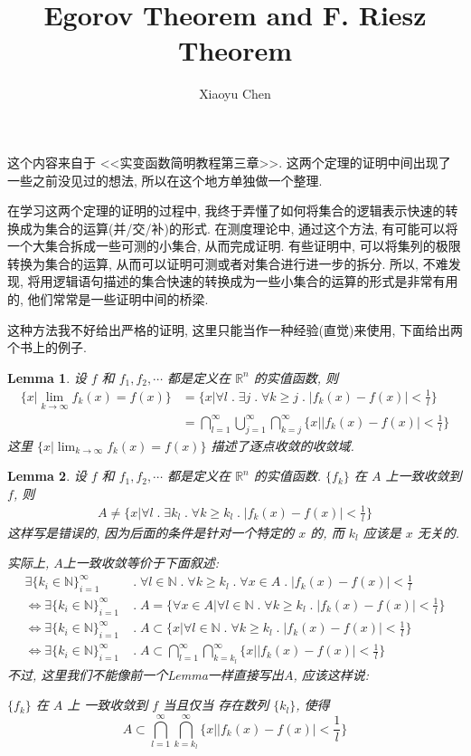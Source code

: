 \documentclass{article}
\title{Egorov Theorem and F. Riesz Theorem}
\author{Xiaoyu Chen}
\date{}
\newtheorem{lemma}{Lemma}
\begin{document}
\maketitle
这个内容来自于 <<实变函数简明教程第三章>>.
这两个定理的证明中间出现了一些之前没见过的想法, 所以在这个地方单独做一个整理.

在学习这两个定理的证明的过程中, 我终于弄懂了如何将集合的逻辑表示快速的转换成为集合的运算(并/交/补)的形式.
在测度理论中, 通过这个方法, 有可能可以将一个大集合拆成一些可测的小集合, 从而完成证明.
有些证明中, 可以将集列的极限转换为集合的运算, 从而可以证明可测或者对集合进行进一步的拆分.
所以, 不难发现, 将用逻辑语句描述的集合快速的转换成为一些小集合的运算的形式是非常有用的, 他们常常是一些证明中间的桥梁.

这种方法我不好给出严格的证明, 这里只能当作一种经验(直觉)来使用, 下面给出两个书上的例子.
\begin{lemma}
  设 $f$ 和 $f_1, f_2, \cdots$ 都是定义在 $\mathbb{R}^n$ 的实值函数, 则
  \begin{align*}
    \{x | \lim_{k\to\infty} f_k(x) = f(x)\}
    &= \{x | \forall l \;.\; \exists j \;.\; \forall k \geq j \;.\; |f_k(x) - f(x)| < \frac{1}{l}\} \\
    &= \bigcap_{l=1}^\infty \bigcup_{j=1}^\infty \bigcap_{k = j}^\infty \{x| |f_k(x) - f(x)| < \frac{1}{l}\}
  \end{align*}
  这里 $\{x | \lim_{k\to\infty} f_k(x) = f(x)\}$ 描述了逐点收敛的收敛域.
\end{lemma}
\begin{lemma}
  \label{lem:A}
  设 $f$ 和 $f_1, f_2, \cdots$ 都是定义在 $\mathbb{R}^n$ 的实值函数.
  $\{f_k\}$ 在 $A$ 上一致收敛到 $f$, 则
  \begin{align*}
    A \not= \{x | \forall l \;.\; \exists k_l \;.\; \forall k \geq k_l \;.\; |f_k(x) - f(x)| < \frac{1}{l}\}
  \end{align*}
  这样写是错误的, 因为后面的条件是针对一个特定的 $x$ 的, 而 $k_l$ 应该是 $x$ 无关的.
  
  实际上, $A$上一致收敛等价于下面叙述:
  \begin{align*}
    \exists\{k_i\in\mathbb{N}\}_{i=1}^\infty &\;.\; \forall l \in \mathbb{N} \;.\; \forall k \geq k_l \;.\; \forall x\in A \;.\; |f_k(x) - f(x)| < \frac{1}{l} \\
    \Leftrightarrow \exists\{k_i\in\mathbb{N}\}_{i=1}^\infty &\;.\; A = \{\forall x\in A | \forall l \in \mathbb{N} \;.\; \forall k \geq k_l \;.\; |f_k(x) - f(x)| < \frac{1}{l}\} \\
    \Leftrightarrow \exists\{k_i\in\mathbb{N}\}_{i=1}^\infty &\;.\; A \subset \{x| \forall l \in \mathbb{N} \;.\; \forall k \geq k_l \;.\; |f_k(x) - f(x)| < \frac{1}{l}\} \\
    \Leftrightarrow \exists\{k_i\in\mathbb{N}\}_{i=1}^\infty &\;.\; A \subset \bigcap_{l=1}^\infty \bigcap_{k=k_l}^\infty \{x| |f_k(x) - f(x)| < \frac{1}{l}\} 
  \end{align*}
  不过, 这里我们不能像前一个Lemma一样直接写出$A$, 应该这样说:

  $\{f_k\}$ 在 $A$ 上 一致收敛到 $f$ 当且仅当 存在数列 $\{k_l\}$, 使得 
  \[A \subset \bigcap_{l=1}^\infty \bigcap_{k=k_l}^\infty \{x| |f_k(x) - f(x)| < \frac{1}{l}\} \]
\end{lemma}
\end{document}
